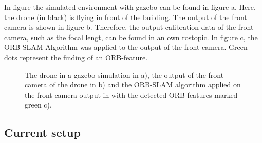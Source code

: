 	
	In figure \cite{fig:simfigs} the simulated environment with gazebo can be found in figure a. Here, the drone (in black) is flying in front of the building. 
	The output of the front camera is shown in figure b. Therefore, the output calibration data of the front camera, such as the focal lengt, 
	can be found in an own rostopic. In figure c, the ORB-SLAM-Algorithm was applied to the output of the front camera. Green dots represent the 
	finding of an ORB-feature. 
	
	
	\begin{figure}%
    \centering
    \qquad
	\qquad
    \caption{
	The drone in a gazebo simulation in a), the output of the front camera of the drone in b) and
	the ORB-SLAM algorithm applied on the front camera output in with the detected ORB features marked green c).
	}%
    \label{fig:simfigs}%
	\end{figure}
	
	\subsection{Current setup}
	
